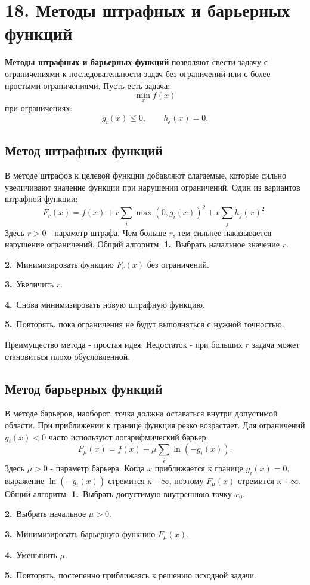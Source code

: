 \documentclass[12pt,a4paper]{article}
\begin{document}
\section{18. Методы штрафных и барьерных функций}
\textbf{Методы штрафных и барьерных функций} позволяют свести задачу с ограничениями к последовательности задач без ограничений или с более простыми ограничениями.
Пусть есть задача:
\[
\min_x f(x)
\]
при ограничениях:
\[
g_i(x)\le 0,\qquad h_j(x)=0.
\]
\subsection{Метод штрафных функций}
В методе штрафов к целевой функции добавляют слагаемые, которые сильно увеличивают значение функции при нарушении ограничений.
Один из вариантов штрафной функции:
\[
F_r(x)=f(x)+r\sum_i\max(0,g_i(x))^2+r\sum_j h_j(x)^2.
\]
Здесь $r>0$ - параметр штрафа. Чем больше $r$, тем сильнее наказывается нарушение ограничений.
Общий алгоритм:
\noindent\textbf{1.}\ Выбрать начальное значение $r$.\par
\noindent\textbf{2.}\ Минимизировать функцию $F_r(x)$ без ограничений.\par
\noindent\textbf{3.}\ Увеличить $r$.\par
\noindent\textbf{4.}\ Снова минимизировать новую штрафную функцию.\par
\noindent\textbf{5.}\ Повторять, пока ограничения не будут выполняться с нужной точностью.\par
Преимущество метода - простая идея. Недостаток - при больших $r$ задача может становиться плохо обусловленной.
\subsection{Метод барьерных функций}
В методе барьеров, наоборот, точка должна оставаться внутри допустимой области. При приближении к границе функция резко возрастает.
Для ограничений $g_i(x)<0$ часто используют логарифмический барьер:
\[
F_\mu(x)=f(x)-\mu\sum_i\ln(-g_i(x)).
\]
Здесь $\mu>0$ - параметр барьера. Когда $x$ приближается к границе $g_i(x)=0$, выражение $\ln(-g_i(x))$ стремится к $-\infty$, поэтому $F_\mu(x)$ стремится к $+\infty$.
Общий алгоритм:
\noindent\textbf{1.}\ Выбрать допустимую внутреннюю точку $x_0$.\par
\noindent\textbf{2.}\ Выбрать начальное $\mu>0$.\par
\noindent\textbf{3.}\ Минимизировать барьерную функцию $F_\mu(x)$.\par
\noindent\textbf{4.}\ Уменьшить $\mu$.\par
\noindent\textbf{5.}\ Повторять, постепенно приближаясь к решению исходной задачи.\par
\end{document}
